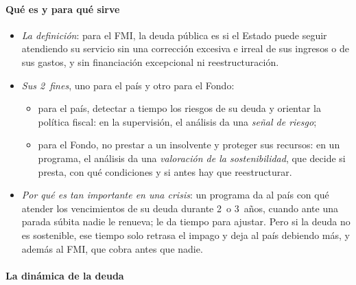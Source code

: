 \documentclass[11pt]{article}
\begin{document}
\paragraph{Qué es y para qué sirve}

\begin{itemize}
\item \emph{La definición}: para el FMI, la deuda pública es  si el Estado puede seguir atendiendo su servicio sin una corrección excesiva e irreal de sus ingresos o de sus gastos, y sin financiación excepcional ni reestructuración\nocite{FMI2021DSA}.
\item \emph{Sus 2~fines}, uno para el país y otro para el Fondo:
  \begin{itemize}
  \item para el país, detectar a tiempo los riesgos de su deuda y orientar la política fiscal: en la supervisión, el análisis da una \emph{señal de riesgo};
  \item para el Fondo, no prestar a un insolvente y proteger sus recursos: en un programa, el análisis da una \emph{valoración de la sostenibilidad}, que decide si presta, con qué condiciones y si antes hay que reestructurar.
  \end{itemize}
\item \emph{Por qué es tan importante en una crisis}: un programa da al país con qué atender los vencimientos de su deuda durante 2~o 3~años, cuando ante una parada súbita nadie le renueva; le da tiempo para ajustar. Pero si la deuda no es sostenible, ese tiempo solo retrasa el impago y deja al país debiendo más, y además al FMI, que cobra antes que nadie.
\end{itemize}

\paragraph{La dinámica de la deuda}
\end{document}
